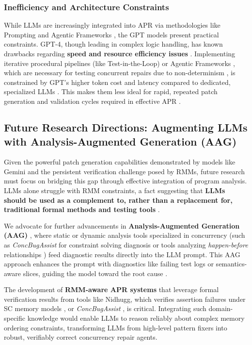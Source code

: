 \subsubsection{Inefficiency and Architecture Constraints}

While LLMs are increasingly integrated into APR via methodologies like Prompting and Agentic Frameworks \cite{anand2024}, the GPT models present practical constraints. GPT-4, though leading in complex logic handling, has known drawbacks regarding \textbf{speed and resource efficiency issues} \cite{anand2024}. Implementing iterative procedural pipelines (like Test-in-the-Loop) or Agentic Frameworks \cite{anand2024}, which are necessary for testing concurrent repairs due to non-determinism \cite{anand2024}, is constrained by GPT's higher token cost and latency compared to dedicated, specialized LLMs \cite{liu2021_2}. This makes them less ideal for rapid, repeated patch generation and validation cycles required in effective APR \cite{khoshnood2015}.

\subsection{Future Research Directions: Augmenting LLMs with Analysis-Augmented Generation (AAG)}

Given the powerful patch generation capabilities demonstrated by models like Gemini and the persistent verification challenge posed by RMMs, future research must focus on bridging this gap through effective integration of program analysis. LLMs alone struggle with RMM constraints, a fact suggesting that \textbf{LLMs should be used as a complement to, rather than a replacement for, traditional formal methods and testing tools} \cite{jain2025}.

We advocate for further advancements in \textbf{Analysis-Augmented Generation (AAG)} \cite{yang2025}, where static or dynamic analysis tools specialized in concurrency (such as \textit{ConcBugAssist} \cite{khoshnood2015} for constraint solving diagnosis or tools analyzing \textit{happen-before} relationships \cite{deng2015f}) feed diagnostic results directly into the LLM prompt. This AAG approach enhances the prompt with diagnostics like failing test logs or semantics-aware slices, guiding the model toward the root cause \cite{yang2025}.

The development of \textbf{RMM-aware APR systems} that leverage formal verification results from tools like Nidhugg, which verifies assertion failures under SC memory models \cite{jain2025}, or \textit{ConcBugAssist} \cite{khoshnood2015}, is critical. Integrating such domain-specific knowledge would enable LLMs to reason reliably about complex memory ordering constraints, transforming LLMs from high-level pattern fixers into robust, verifiably correct concurrency repair agents.